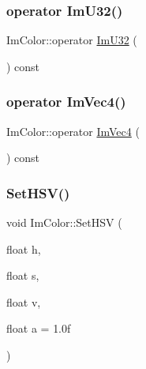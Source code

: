\mbox{\label{struct_im_color_a4f4fc53e0676d50404d6d5ffcf16637f}} 
\subsubsection{\texorpdfstring{operator Im\+U32()}{operator ImU32()}}
{\footnotesize\ttfamily Im\+Color\+::operator \mbox{\hyperlink{imgui_8h_a118cff4eeb8d00e7d07ce3d6460eed36}{Im\+U32}} (\begin{DoxyParamCaption}{ }\end{DoxyParamCaption}) const\hspace{0.3cm}{\ttfamily [inline]}}

\mbox{\label{struct_im_color_a10f1de242f13c93f8be64545e4cbcb0a}} 
\subsubsection{\texorpdfstring{operator Im\+Vec4()}{operator ImVec4()}}
{\footnotesize\ttfamily Im\+Color\+::operator \mbox{\hyperlink{struct_im_vec4}{Im\+Vec4}} (\begin{DoxyParamCaption}{ }\end{DoxyParamCaption}) const\hspace{0.3cm}{\ttfamily [inline]}}

\mbox{\label{struct_im_color_afcff20160db703b956d56e5a9fa88e24}} 
\subsubsection{\texorpdfstring{Set\+H\+S\+V()}{SetHSV()}}
{\footnotesize\ttfamily void Im\+Color\+::\+Set\+H\+SV (\begin{DoxyParamCaption}\item[{float}]{h,  }\item[{float}]{s,  }\item[{float}]{v,  }\item[{float}]{a = {\ttfamily 1.0f} }\end{DoxyParamCaption})\hspace{0.3cm}{\ttfamily [inline]}}



